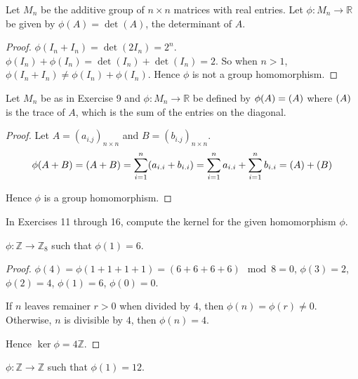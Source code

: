 \begin{exercise}
    Let $M_{n}$ be the additive group of $n\times n$ matrices with real entries. Let $\phi: M_{n}\to \mathbb{R}$ be given by $\phi(A) = \det(A)$, the determinant of $A$.
\end{exercise}

\begin{proof}
    $\phi(I_{n} + I_{n}) = \det(2I_{n}) = 2^{n}$. $\phi(I_{n}) + \phi(I_{n}) = \det(I_{n}) + \det(I_{n}) = 2$. So when $n > 1$, $\phi(I_{n} + I_{n}) \ne \phi(I_{n}) + \phi(I_{n})$. Hence $\phi$ is not a group homomorphism.
\end{proof}

\begin{exercise}
    Let $M_{n}$ be as in Exercise 9 and $\phi: M_{n} \to \mathbb{R}$ be defined by $\phi(A) = \left({A}\right)$ where $\left({A}\right)$ is the trace of $A$, which is the sum of the entries on the diagonal.
\end{exercise}

\begin{proof}
    Let $A = {(a_{i.j})}_{n\times n}$ and $B = {(b_{i.j})}_{n\times n}$.
    \[
        \phi(A + B) = \left({A + B}\right) = \sum^{n}_{i=1}(a_{i.i} + b_{i.i}) = \sum^{n}_{i=1}a_{i.i} + \sum^{n}_{i=1}b_{i.i} = \left({A}\right) + \left({B}\right)
    \]

    Hence $\phi$ is a group homomorphism.
\end{proof}

In Exercises 11 through 16, compute the kernel for the given homomorphism $\phi$.

\begin{exercise}
    $\phi: \mathbb{Z} \to \mathbb{Z}_{8}$ such that $\phi(1) = 6$.
\end{exercise}

\begin{proof}
    $\phi(4) = \phi(1 + 1 + 1 + 1) = (6 + 6 + 6 + 6)\mod 8 = 0$, $\phi(3) = 2$, $\phi(2) = 4$, $\phi(1) = 6$, $\phi(0) = 0$.

    If $n$ leaves remainer $r > 0$ when divided by $4$, then $\phi(n) = \phi(r) \ne 0$. Otherwise, $n$ is divisible by $4$, then $\phi(n) = 4$.

    Hence $\ker\phi = 4\mathbb{Z}$.
\end{proof}

\begin{exercise}
    $\phi: \mathbb{Z} \to \mathbb{Z}$ such that $\phi(1) = 12$.
\end{exercise}

